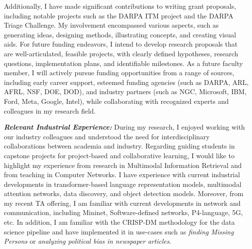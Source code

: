 \documentclass[9pt]{article}
\renewcommand*\paragraph[1]{}
\begin{document}
Additionally, I have made significant contributions to writing grant proposals, including notable projects such as the DARPA ITM project and the DARPA Triage Challenge. My involvement encompassed various aspects, such as generating ideas, designing methods, illustrating concepts, and creating visual aids. For future funding endeavors, I intend to develop research proposals that are well-articulated, feasible projects, with clearly defined hypotheses, research questions, implementation plans, and identifiable milestones. As a future faculty member, I will actively pursue funding opportunities from a range of sources, including early career support, esteemed funding agencies (such as DARPA, ARL, AFRL, NSF, DOE, DOD), and industry partners (such as NGC, Microsoft, IBM, Ford, Meta, Google, Intel), while collaborating with recognized experts and colleagues in my research field. 


\paragraph{P3) Relevant industrial experience beneficial to CS/ DS curriculum development and CS/DS capstone project advising}

\textbf{\textit{Relevant Industrial Experience:}}
During my research, I enjoyed working with our industry colleagues and understood the need for interdisciplinary collaborations between academia and industry.
Regarding guiding students in capstone projects for project-based and collaborative learning, I would like to highlight my experience from research in Multimodal Information Retrieval and from teaching in Computer Networks. I have experience with current industrial developments in transformer-based language representation models, multimodal attention networks, data discovery, and object detection models. Moreover, from my recent TA offering, I am familiar with current developments in network and communication, including Mininet, Software-defined networks, P4-language, 5G, etc. In addition, I am familiar with the CRISP-DM methodology for the data science pipeline and have implemented it in use-cases such as \textit{finding Missing Persons} or \textit{analyzing political bias in newspaper articles}. 
\end{document}
